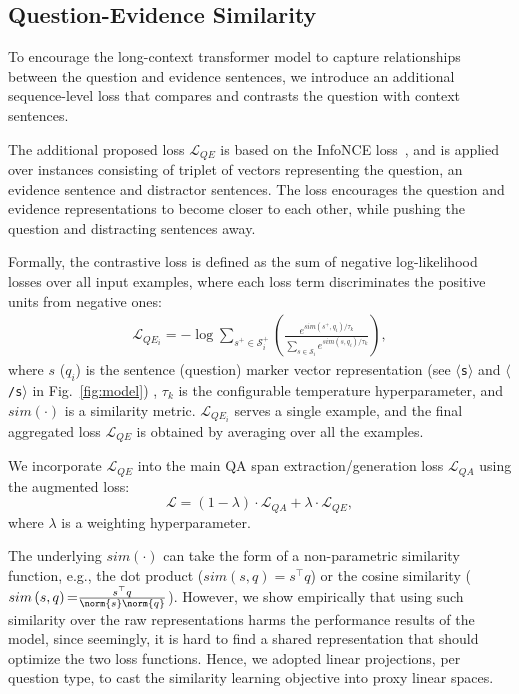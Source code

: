\subsection{Question-Evidence Similarity}
\label{subsec:qe_sim}
To encourage the long-context transformer model to capture relationships between the question and evidence sentences, we introduce an additional sequence-level loss that compares and contrasts the question with context sentences. 

The additional proposed loss $\mathcal{L}_{QE}$ is based on the InfoNCE loss~\cite{oord2018representation}, and is applied over instances consisting of triplet of vectors representing the question, an evidence sentence and distractor sentences. The loss encourages the question and evidence representations to become closer to each other, while pushing the question and distracting sentences away. 

Formally, the contrastive loss is defined as the sum of negative log-likelihood losses over all input examples, where each loss term discriminates the positive units from negative ones:
\begin{align}\label{eqn:loss}
    \mathcal{L}_{QE_i} = -\log \sum\limits_{s^+ \in \mathcal{S}^+_i} \left(\frac{e^{sim(s^+, q_i)/\tau_k}}{\sum\limits_{s \in \mathcal{S}_i} e^{sim(s, q_i)/\tau_k}}\right),
\end{align}
where $s$ ($q_i$) is the sentence (question) marker vector representation (see \texttt{$\langle$s$\rangle$} and \texttt{$\langle$/s$\rangle$} in Fig.~\ref{fig:model})%
, $\tau_k$ is the configurable temperature hyperparameter, and $sim(\cdot)$ is a similarity metric. $\mathcal{L}_{QE_i}$ serves a single example, and the final aggregated loss ${\mathcal{L}_{QE}}$ is obtained by averaging over all the examples.

We incorporate $\mathcal{L}_{QE}$ into the main QA span extraction/generation loss $\mathcal{L}_{QA}$ using the augmented loss:
\begin{equation*}
{\mathcal{L}=(1-\lambda)\cdot\mathcal{L}_{QA}+\lambda\cdot\mathcal{L}_{QE},}
\end{equation*}
where $\lambda$ is a weighting hyperparameter. 


The underlying $sim(\cdot)$ can take the form of a non-parametric similarity function, e.g., the dot product ($sim\left(s, q\right){=}s^\top q$) or the cosine similarity ($sim\left(s, q\right){=}\frac{s^\top q}{\norm{s}\norm{q}}$). However, we show empirically that using such similarity over the raw representations harms the performance results of the model, since seemingly, it is hard to find a shared representation that should optimize the two loss functions. Hence, we adopted linear projections, per question type, to cast the similarity learning objective into proxy linear spaces.




